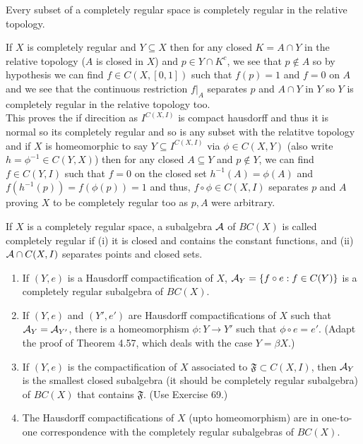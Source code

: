 \documentclass[12pt,a4paper]{article}
\begin{document}
\begin{problem}\label{prob:4-72}
Every subset of a completely regular space is completely regular in the relative topology.
\end{problem}
\begin{solution}
    If $X$ is completely regular and $Y \subseteq X$ then for any closed $K=A\cap Y$ in the relative topology ($A$ is closed in $X$) and $p\in Y\cap K^c$, we see that $p\notin A$ so by hypothesis we can find $f\in C(X,[0,1])$ such that $f(p)=1$ and $f=0$ on $A$ and we see that the continuous restriction $f|_{A}$ separates $p$ and $A\cap Y$ in $Y$ so $Y$ is completely regular in the relative topology too. \\
    This proves the if direcition as $I^{C(X,I)}$ is compact hausdorff and thus it is normal so its completely regular and so is any subset with the relatitve topology and if $X$ is homeomorphic to say $Y \subseteq I^{C(X,I)}$ via $\phi\in C(X,Y)$ (also write $h=\phi^{-1}\in C(Y,X)$) then for any closed $A \subseteq Y$ and $p\notin Y$, we can find $f\in C(Y,I)$ such that $f=0$ on the closed set $h^{-1}(A)=\phi(A)$ and $f(h^{-1}(p))=f(\phi(p))=1$ and thus, $f\circ\phi\in C(X,I)$ separates $p$ and $A$ proving $X$ to be completely regular too as $p,A$ were arbitrary. 
\end{solution}
\begin{problem}\label{prob:4-73}
If $X$ is a completely regular space, a subalgebra $\mathcal{A}$ of $BC(X)$ is called completely regular if (i) it is closed and contains the constant functions, and (ii) $\mathcal{A} \cap C(X,I)$ separates points and closed sets.
\begin{enumerate}[label=\alph*.]
    \item If $(Y, e)$ is a Hausdorff compactification of $X$, $\mathcal{A}_Y = \{f \circ e : f \in C(Y)\}$ is a completely regular subalgebra of $BC(X)$.
    \item If $(Y, e)$ and $(Y',e')$ are Hausdorff compactifications of $X$ such that $\mathcal{A}_Y = \mathcal{A}_{Y'}$, there is a homeomorphism $\phi : Y \to Y'$ such that $\phi \circ e = e'$. (Adapt the proof of Theorem 4.57, which deals with the case $Y = \beta X$.)
    \item If $(Y, e)$ is the compactification of $X$ associated to $\mathfrak{F} \subset C(X,I)$, then $\mathcal{A}_Y$ is the smallest closed subalgebra (it should be completely regular subalgebra) of $BC(X)$ that contains $\mathfrak{F}$. (Use Exercise 69.)
    \item The Hausdorff compactifications of $X$ (upto homeomorphism) are in one-to-one correspondence with the completely regular subalgebras of $BC(X)$.
\end{enumerate}
\end{problem}
\end{document}
